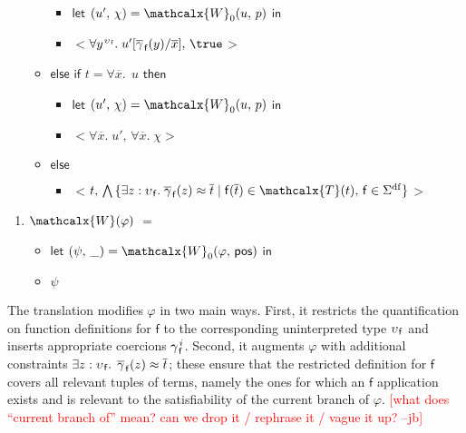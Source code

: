 \documentclass[runningheads,a4paper]{llncs}
\newcommand\return{}
\newcommand\bigtuple[1]{$\bigl<${#1}$\bigr>$}
\newcommand{\con}[1]{\mathsf{#1}}
\renewcommand\vec[1]{\overline{#1}}
\let\oldSigma=\Sigma
\def\Sigma{\mathrm{\oldSigma}}
\newcommand{\teq}{\approx}
\newcommand{\terms}{\mathcalx{T}}
\newcommand{\conv}{\mathcalx{W}}
\newcommand{\sfundefs}[1]{#1^\mathrm{df}}
\newcommand{\ptrue}{\con{pos}}
\newcommand\concret{\gamma} %
\newcommand{\vecfarg}[1]{\vec{\concret}_{\vthinspace#1}}
\newcommand{\fargx}[2]{\concret^{\vthinspace#2}_{\vthinspace#1}}
\newcommand{\fargsort}[1]{\upsilon_{\vthinspace#1}}
\newcommand{\rem}[1]{\textcolor{red}{[#1]}}
\newcommand{\jb}[1]{\rem{#1 --jb}}
\newcommand{\vthinspace}{\kern+0.083333em}
\newcommand{\typ}[1]{^{\vthinspace #1}}
\begin{document}
\begin{enumerate}
\begin{itemize}
    \begin{itemize}
      \item[] $\mathsf{let}$ $( u',\, \chi ) = \conv_0( u,\, p )$ $\mathsf{in}$
      \item[] \return \bigtuple{$\forall y\typ{\fargsort{\con{f}}}.\; u' [ \vecfarg{\con{f}}( y ) / \vec x ],\, \true$}
    \end{itemize}
  \item[] $\mathsf{else}$ $\mathsf{if}$ $t = \forall \vec x.\;\, u$ $\mathsf{then}$
    \begin{itemize}
      \item[] $\mathsf{let}$ $( u',\, \chi ) = \conv_0( u,\, p )$ $\mathsf{in}$
      \item[] \return \bigtuple{$\forall \vec x.\; u',\, \forall \vec x.\; \chi$}
    \end{itemize}
   \item[] $\mathsf{else}$
   \begin{itemize}
     \item[] \return \bigtuple{$t,\, \bigwedge\, \{ \exists z : \fargsort{\con{f}}.\; \vecfarg{\con{f}}( z ) \teq \vec t \mid \con{f}( \vec t ) \in \terms( t ),\, \con{f} \in \sfundefs{\Sigma} \}$}
   \end{itemize}
 \end{itemize}
\end{enumerate}
\begin{enumerate}
\item[\ ] 
$\conv( \varphi )$ $=$
 \begin{itemize}
   \item[] $\mathsf{let}$ $( \psi,\, \_ ) = \conv_0( \varphi,\, \ptrue )$ $\mathsf{in}$
   \item[] \return $\psi$
  \end{itemize}
\end{enumerate}


The translation modifies $\varphi$ in two main ways. First, it restricts the
quantification on function definitions for $\con{f}$ to the corresponding
uninterpreted type $\fargsort{\con{f}}$ and inserts appropriate coercions
$\fargx{\con{f}}{i}$. Second, it augments $\varphi$ with additional constraints
$\exists z : \fargsort{\con{f}}.\;\, \vecfarg{\con{f}}( z ) \teq \vec t$; these
ensure that the restricted definition for $\con{f}$ covers all relevant tuples
of terms, namely the ones for which an $\con{f}$ application exists and is
relevant to the satisfiability of the current branch of $\varphi$.
\jb{what does ``current branch of'' mean? can we drop it / rephrase it / vague
it up?}
\end{document}
